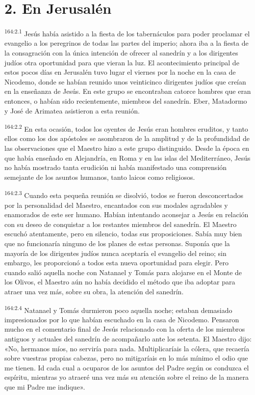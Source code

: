 \section*{2. En Jerusalén}
\par 
\textsuperscript{164:2.1} Jesús había asistido a la fiesta de los tabernáculos para poder proclamar el evangelio a los peregrinos de todas las partes del imperio; ahora iba a la fiesta de la consagración con la única intención de ofrecer al sanedrín y a los dirigentes judíos otra oportunidad para que vieran la luz. El acontecimiento principal de estos pocos días en Jerusalén tuvo lugar el viernes por la noche en la casa de Nicodemo, donde se habían reunido unos veinticinco dirigentes judíos que creían en la enseñanza de Jesús. En este grupo se encontraban catorce hombres que eran entonces, o habían sido recientemente, miembros del sanedrín. Eber, Matadormo y José de Arimatea asistieron a esta reunión.

\par 
\textsuperscript{164:2.2} En esta ocasión, todos los oyentes de Jesús eran hombres eruditos, y tanto ellos como los dos apóstoles se asombraron de la amplitud y de la profundidad de las observaciones que el Maestro hizo a este grupo distinguido. Desde la época en que había enseñado en Alejandría, en Roma y en las islas del Mediterráneo, Jesús no había mostrado tanta erudición ni había manifestado una comprensión semejante de los asuntos humanos, tanto laicos como religiosos.

\par 
\textsuperscript{164:2.3} Cuando esta pequeña reunión se disolvió, todos se fueron desconcertados por la personalidad del Maestro, encantados con sus modales agradables y enamorados de este ser humano. Habían intentando aconsejar a Jesús en relación con su deseo de conquistar a los restantes miembros del sanedrín. El Maestro escuchó atentamente, pero en silencio, todas sus proposiciones. Sabía muy bien que no funcionaría ninguno de los planes de estas personas. Suponía que la mayoría de los dirigentes judíos nunca aceptaría el evangelio del reino; sin embargo, les proporcionó a todos esta nueva oportunidad para elegir. Pero cuando salió aquella noche con Natanael y Tomás para alojarse en el Monte de los Olivos, el Maestro aún no había decidido el método que iba adoptar para atraer una vez más, sobre su obra, la atención del sanedrín.

\par 
\textsuperscript{164:2.4} Natanael y Tomás durmieron poco aquella noche; estaban demasiado impresionados por lo que habían escuchado en la casa de Nicodemo. Pensaron mucho en el comentario final de Jesús relacionado con la oferta de los miembros antiguos y actuales del sanedrín de acompañarlo ante los setenta. El Maestro dijo: «No, hermanos míos, no serviría para nada. Multiplicaríais la cólera, que recaería sobre vuestras propias cabezas, pero no mitigaríais en lo más mínimo el odio que me tienen. Id cada cual a ocuparos de los asuntos del Padre según os conduzca el espíritu, mientras yo atraeré una vez más su atención sobre el reino de la manera que mi Padre me indique».

